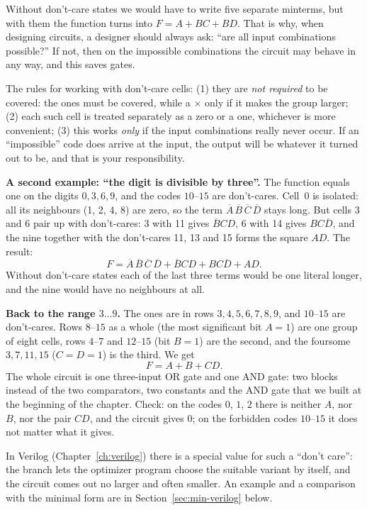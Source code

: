 Without don't-care states we would have to write five separate minterms, but
with them the function turns into $F = A + BC + BD$. That is why, when
designing circuits, a designer should always ask: ``are all input combinations
possible?'' If not, then on the impossible combinations the circuit may
behave in any way, and this saves gates.

The rules for working with don't-care cells: (1) they are \emph{not required}
to be covered: the ones must be covered, while a $\times$ only if it makes the
group larger; (2) each such cell is treated separately as a zero or a one,
whichever is more convenient; (3) this works \emph{only} if the input
combinations really never occur. If an ``impossible'' code does arrive at the
input, the output will be whatever it turned out to be, and that is your
responsibility.

\textbf{A second example: ``the digit is divisible by three''.} The function
equals one on the digits $0,3,6,9$, and the codes $10$--$15$ are don't-cares.
Cell~0 is isolated: all its neighbours (1, 2, 4, 8) are zero, so the term
$\overline{A}\,\overline{B}\,\overline{C}\,\overline{D}$ stays long. But
cells 3 and 6 pair up with don't-cares: 3 with 11 gives $\overline{B}CD$, 6
with 14 gives $BC\overline{D}$, and the nine together with the don't-cares
11, 13 and 15 forms the square $AD$. The result:
\[
  F=\overline{A}\,\overline{B}\,\overline{C}\,\overline{D}+\overline{B}CD+BC\overline{D}+AD.
\]
Without don't-care states each of the last three terms would be one literal
longer, and the nine would have no neighbours at all.

\textbf{Back to the range $3\ldots9$.} The ones are in rows
$3,4,5,6,7,8,9$, and $10$--$15$ are don't-cares. Rows $8$--$15$ as a whole
(the most significant bit $A=1$) are one group of eight cells, rows $4$--$7$
and $12$--$15$ (bit $B=1$) are the second, and the foursome $3,7,11,15$
($C=D=1$) is the third. We get
\[
  F=A+B+CD.
\]
The whole circuit is one three-input OR gate and one AND gate: two blocks
instead of the two comparators, two constants and the AND gate that we built
at the beginning of the chapter. Check: on the codes $0$, $1$, $2$ there is
neither $A$, nor $B$, nor the pair $CD$, and the circuit gives $0$; on the
forbidden codes $10$--$15$ it does not matter what it gives.

\begin{infobox}
In Verilog (Chapter~\ref{ch:verilog}) there is a special value  for
such a ``don't care'': the branch  lets the
optimizer program choose the suitable variant by itself, and the circuit
comes out no larger and often smaller. An example and a comparison with the
minimal form are in Section~\ref{sec:min-verilog} below.
\end{infobox}


